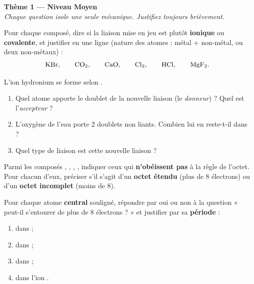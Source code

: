 \documentclass[11pt,a4paper]{article}
\begin{document}
\begin{center}
{\Large\bfseries\color{primarydark}Thème 1 — Niveau Moyen}\\[2pt]
{\small\itshape Chaque question isole une seule mécanique. Justifiez toujours brièvement.}
\end{center}
\medskip

\begin{exo}
Pour chaque composé, dire si la liaison mise en jeu est plutôt \textbf{ionique} ou
\textbf{covalente}, et justifier en une ligne (nature des atomes : métal + non-métal, ou deux
non-métaux) :
\[ \ce{KBr}, \qquad \ce{CO2}, \qquad \ce{CaO}, \qquad \ce{Cl2}, \qquad \ce{HCl}, \qquad \ce{MgF2}. \]
\end{exo}

\begin{exo}
L'ion hydronium se forme selon .
\begin{enumerate}[label=\alph*),leftmargin=2em,itemsep=1pt]
  \item Quel atome apporte le doublet de la nouvelle liaison (le \emph{donneur}) ? Quel est
        l'\emph{accepteur} ?
  \item L'oxygène de l'eau porte 2 doublets non liants. Combien lui en reste-t-il dans  ?
  \item Quel type de liaison est cette nouvelle liaison  ?
\end{enumerate}
\end{exo}

\begin{exo}
Parmi les composés , \;, \;, \;, indiquer ceux qui
\textbf{n'obéissent pas} à la règle de l'octet. Pour chacun d'eux, préciser s'il s'agit d'un
\textbf{octet étendu} (plus de 8 électrons) ou d'un \textbf{octet incomplet} (moins de 8).
\end{exo}

\begin{exo}
Pour chaque atome \textbf{central} souligné, répondre par oui ou non à la question « peut-il
s'entourer de plus de 8 électrons ? » et justifier par sa \textbf{période} :
\begin{enumerate}[label=\alph*),leftmargin=2em,itemsep=1pt]
  \item \underline{} dans  ;
  \item \underline{} dans  ;
  \item \underline{} dans  ;
  \item \underline{} dans l'ion .
\end{enumerate}
\end{exo}
\end{document}
